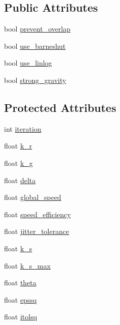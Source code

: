 \subsection*{Public Attributes}
\begin{DoxyCompactItemize}
\item 
bool \mbox{\hyperlink{classRPGraph_1_1ForceAtlas2_ad2fa1a5b6042c22d44b84b85b10cffe1}{prevent\+\_\+overlap}}
\item 
bool \mbox{\hyperlink{classRPGraph_1_1ForceAtlas2_a6ca74377ba79a67e4d1660c61426c090}{use\+\_\+barneshut}}
\item 
bool \mbox{\hyperlink{classRPGraph_1_1ForceAtlas2_a5f1e78d982b10646f7d79fef5cc49ea7}{use\+\_\+linlog}}
\item 
bool \mbox{\hyperlink{classRPGraph_1_1ForceAtlas2_afabfd0d83e05a54de889a62d0ff7595e}{strong\+\_\+gravity}}
\end{DoxyCompactItemize}
\subsection*{Protected Attributes}
\begin{DoxyCompactItemize}
\item 
int \mbox{\hyperlink{classRPGraph_1_1ForceAtlas2_a3d382e3059747c692b1ef2b1cd49f44f}{iteration}}
\item 
float \mbox{\hyperlink{classRPGraph_1_1ForceAtlas2_ac0f82f64f66f1798d8f1ee5905ccf192}{k\+\_\+r}}
\item 
float \mbox{\hyperlink{classRPGraph_1_1ForceAtlas2_a4132cf261a746246639e0fb4960ba090}{k\+\_\+g}}
\item 
float \mbox{\hyperlink{classRPGraph_1_1ForceAtlas2_a39051fda34ae96395209e8b5657a61bd}{delta}}
\item 
float \mbox{\hyperlink{classRPGraph_1_1ForceAtlas2_a04219199074fb0c1df44ba407879931e}{global\+\_\+speed}}
\item 
float \mbox{\hyperlink{classRPGraph_1_1ForceAtlas2_aeb9cda3185f43eb86228ff94cbbfdc70}{speed\+\_\+efficiency}}
\item 
float \mbox{\hyperlink{classRPGraph_1_1ForceAtlas2_a8b16236d6e7ba96fd336a6ee42409cad}{jitter\+\_\+tolerance}}
\item 
float \mbox{\hyperlink{classRPGraph_1_1ForceAtlas2_a25607f52ab0f974f4c34b2640e489c4f}{k\+\_\+s}}
\item 
float \mbox{\hyperlink{classRPGraph_1_1ForceAtlas2_afd775897f15200bece280cc5e052748c}{k\+\_\+s\+\_\+max}}
\item 
float \mbox{\hyperlink{classRPGraph_1_1ForceAtlas2_a357410aff9f549a1842298be6449b500}{theta}}
\item 
float \mbox{\hyperlink{classRPGraph_1_1ForceAtlas2_a591500c4981d3bf51c3e624d2c68853d}{epssq}}
\item 
float \mbox{\hyperlink{classRPGraph_1_1ForceAtlas2_aa3dd88a578de8e809ca40f75526ee6b6}{itolsq}}
\end{DoxyCompactItemize}


